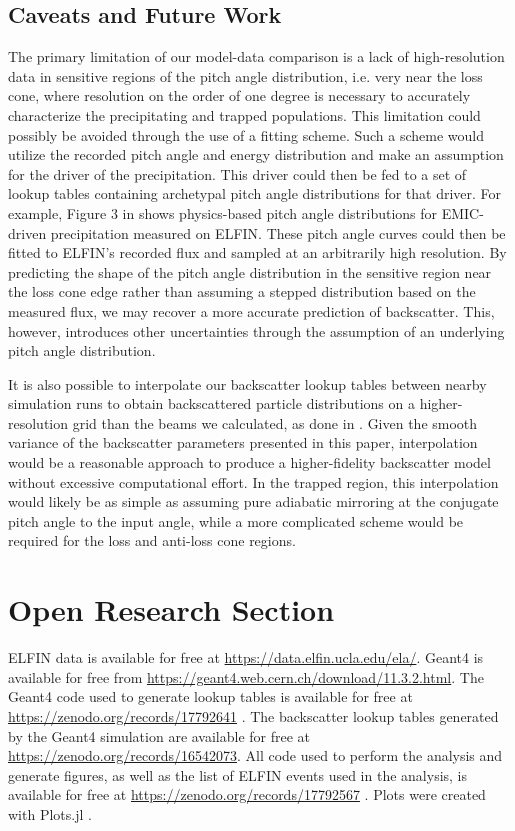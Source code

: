 \documentclass[draft]{agujournal2019}
\begin{document}
\subsection{Caveats and Future Work}
The primary limitation of our model-data comparison is a lack of high-resolution data in sensitive regions of the pitch angle distribution, i.e. very near the loss cone, where resolution on the order of one degree is necessary to accurately characterize the precipitating and trapped populations. This limitation could possibly be avoided through the use of a fitting scheme. Such a scheme would utilize the recorded pitch angle and energy distribution and make an assumption for the driver of the precipitation. This driver could then be fed to a set of lookup tables containing archetypal pitch angle distributions for that driver. For example, Figure 3 in  shows physics-based pitch angle distributions for EMIC-driven precipitation measured on ELFIN. These pitch angle curves could then be fitted to ELFIN's recorded flux and sampled at an arbitrarily high resolution. By predicting the shape of the pitch angle distribution in the sensitive region near the loss cone edge rather than assuming a stepped distribution based on the measured flux, we may recover a more accurate prediction of backscatter. This, however, introduces other uncertainties through the assumption of an underlying pitch angle distribution.

It is also possible to interpolate our backscatter lookup tables between nearby simulation runs to obtain backscattered particle distributions on a higher-resolution grid than the beams we calculated, as done in . Given the smooth variance of the backscatter parameters presented in this paper, interpolation would be a reasonable approach to produce a higher-fidelity backscatter model without excessive computational effort. In the trapped region, this interpolation would likely be as simple as assuming pure adiabatic mirroring at the conjugate pitch angle to the input angle, while a more complicated scheme would be required for the loss and anti-loss cone regions.

%
%

\section*{Open Research Section}
ELFIN data \cite{angelopoulos2020} is available for free at \url{https://data.elfin.ucla.edu/ela/}. Geant4 \cite{agostinelli2003} is available for free from \url{https://geant4.web.cern.ch/download/11.3.2.html}. The Geant4 code used to generate lookup tables is available for free at \url{https://zenodo.org/records/17792641} \cite{claxton2025-g4epp}. The backscatter lookup tables generated by the Geant4 simulation are available for free at \url{https://zenodo.org/records/16542073}. All code used to perform the analysis and generate figures, as well as the list of ELFIN events used in the analysis, is available for free at \url{https://zenodo.org/records/17792567} \cite{claxton2025-backscatter-code}. Plots were created with Plots.jl \cite{julia-plots}.
\end{document}
